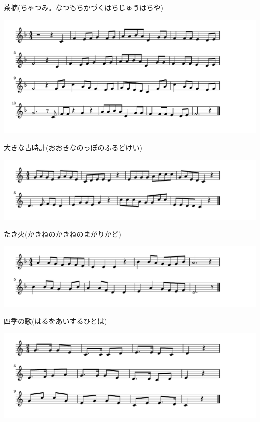 \documentclass[a4paper]{ltjsarticle}
\begin{document}
\vspace{-10mm} \hspace{10mm}
茶摘(ちゃつみ。なつもちかづくはちじゅうはちや)

\includegraphics[clip]{okinafurudokei_crop.pdf}

\vspace{-10mm} \hspace{10mm}
大きな古時計(おおきなのっぽのふるどけい)

\includegraphics[clip]{takibi_crop.pdf}

\vspace{-10mm} \hspace{10mm}
たき火(かきねのかきねのまがりかど)

\includegraphics[clip]{shikinouta_crop.pdf}

\vspace{-10mm} \hspace{10mm}
四季の歌(はるをあいするひとは)

\includegraphics[clip]{katatsumuri_crop.pdf}
\end{document}

